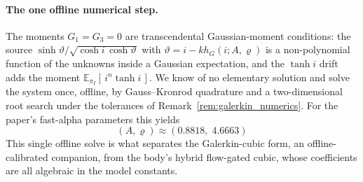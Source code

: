\documentclass[11pt,a4paper]{article}
\newcommand{\E}{\mathbb{E}}
\theoremstyle{plain}
\theoremstyle{definition}
\begin{document}
\paragraph{The one offline numerical step.}
The moments \(G_1=G_3=0\) are transcendental Gaussian-moment conditions: the
source \(\sinh\vartheta/\sqrt{\cosh i\,\cosh\vartheta}\) with
\(\vartheta=i-kh_G(i;A,\varrho)\) is a non-polynomial function of the unknowns
inside a Gaussian expectation, and the \(\tanh i\) drift adds the moment
\(\E_{\pi_I}[\,i^n\tanh i\,]\).  We know of no elementary solution and solve
the system once, offline, by Gauss--Kronrod quadrature and a two-dimensional
root search under the tolerances of Remark~\ref{rem:galerkin_numerics}.  For
the paper's fast-alpha parameters this yields
\begin{equation}
\boxed{\,(A,\varrho)\approx(0.8818,\;4.6663)\,}
\label{eq:fa_galerkin_constants}
\end{equation}
This single offline solve is what separates the Galerkin-cubic form, an
offline-calibrated companion, from the body's hybrid flow-gated cubic, whose
coefficients are all algebraic in the model constants.
\end{document}
